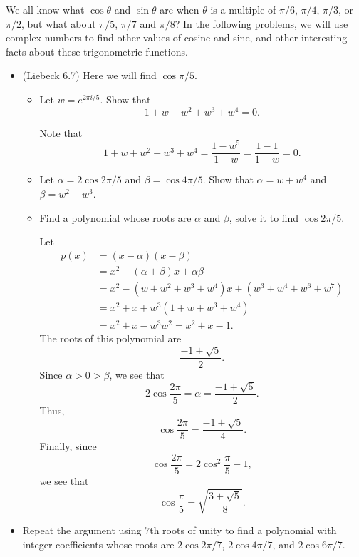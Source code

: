 \documentclass[11pt,dvipsnames]{book}
\numberwithin{equation}{section} %
\numberwithin{figure}{section} %
\numberwithin{table}{section} %
\begin{document}
\begin{exercise} We all know what $\cos \theta$ and $\sin\theta$ are when $\theta$ is a multiple of $\pi/6$, $\pi/4$, $\pi/3$, or $\pi/2$, but what about $\pi/5$, $\pi/7$ and $\pi/8$?  In the following problems, we will use complex numbers to find other values of cosine and sine, and other interesting facts about these trigonometric functions. 


\begin{itemize}

\item (Liebeck 6.7)  Here we will find $\cos \pi/5$.
\begin{itemize}
\item Let $w=e^{2\pi i/5}$. Show that
\[
1+w+w^2+w^3+w^4=0.
\]
\begin{solution}
Note that 
\[
1+w+w^2+w^3+w^4 = \frac{1-w^5}{1-w}=\frac{1-1}{1-w}=0.
\]
\end{solution}

\item Let $\alpha = 2\cos 2\pi/5$ and $\beta = \cos 4\pi/5$. Show that $\alpha = w+w^4$ and $\beta = w^2+w^3$. 

\item Find a polynomial whose roots are $\alpha$ and $\beta$, solve it to find $\cos 2\pi /5$. 

\begin{solution}
Let 
\begin{align*}
p(x) 
& = (x-\alpha)(x-\beta)\\
& =x^2 - (\alpha + \beta)x+\alpha \beta \\
& =x^2 -(w+w^2+w^3+w^4)x+(w^3+w^4+w^6+w^7) \\
& = x^2 +x + w^3 (1+w+w^3+w^4)\\
& = x^2 + x - w^3w^2 = x^2 + x -1 .
\end{align*}
The roots of this polynomial are 
\[
\frac{-1 \pm \sqrt{5}}{2}.
\]
Since $\alpha>0>\beta$, we see that 
\[
2\cos \frac{2\pi}{5} = \alpha  = \frac{-1+\sqrt{5}}{2}.
\]
Thus,
\[
\cos \frac{2\pi}{5} = \frac{-1+\sqrt{5}}{4}.
\]
Finally, since 
\[
\cos \frac{2\pi}{5} = 2\cos^2 \frac{\pi}{5} -1,\]
we see that 
\[
\cos \frac{\pi}{5} = \sqrt{\frac{3 + \sqrt{5}}{8}}.
\]



\end{solution}
\end{itemize}

%
\item Repeat the argument using $7$th roots of unity to find a polynomial with integer coefficients whose roots are $2\cos 2\pi/7$,  $2\cos 4\pi/7$, and $2\cos 6\pi/7$.


\end{itemize}
\end{exercise}
\end{document}
